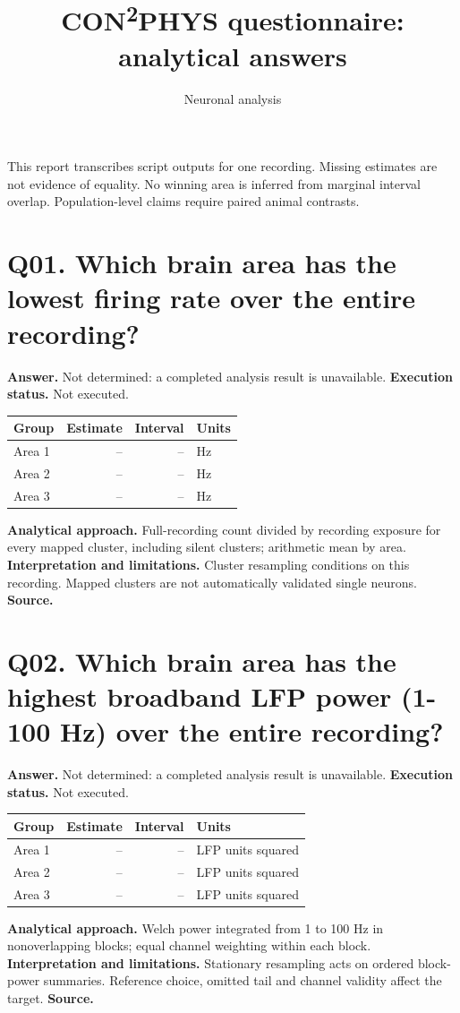 \documentclass[11pt,a4paper]{article}
\begin{document}
\raggedright
\title{CON\textsuperscript{2}PHYS questionnaire: analytical answers}\author{Neuronal analysis}\date{}\maketitle
This report transcribes script outputs for one recording. Missing estimates are not evidence of equality. No winning area is inferred from marginal interval overlap. Population-level claims require paired animal contrasts.
\clearpage
\section*{Q01. Which brain area has the lowest firing rate over the entire recording?}
\textbf{Answer.} Not determined: a completed analysis result is unavailable.
\textbf{Execution status.} Not executed.
\begin{tabularx}{\linewidth}{XrrX}\toprule Group & Estimate & Interval & Units \\\midrule
Area 1 & -- & -- & Hz \\
Area 2 & -- & -- & Hz \\
Area 3 & -- & -- & Hz \\
\bottomrule\end{tabularx}
\textbf{Analytical approach.} Full-recording count divided by recording exposure for every mapped cluster, including silent clusters; arithmetic mean by area.
\textbf{Interpretation and limitations.} Cluster resampling conditions on this recording. Mapped clusters are not automatically validated single neurons.
\textbf{Source.} 
\clearpage
\section*{Q02. Which brain area has the highest broadband LFP power (1-100 Hz) over the entire recording?}
\textbf{Answer.} Not determined: a completed analysis result is unavailable.
\textbf{Execution status.} Not executed.
\begin{tabularx}{\linewidth}{XrrX}\toprule Group & Estimate & Interval & Units \\\midrule
Area 1 & -- & -- & LFP units squared \\
Area 2 & -- & -- & LFP units squared \\
Area 3 & -- & -- & LFP units squared \\
\bottomrule\end{tabularx}
\textbf{Analytical approach.} Welch power integrated from 1 to 100 Hz in nonoverlapping blocks; equal channel weighting within each block.
\textbf{Interpretation and limitations.} Stationary resampling acts on ordered block-power summaries. Reference choice, omitted tail and channel validity affect the target.
\textbf{Source.} 
\clearpage
\end{document}
